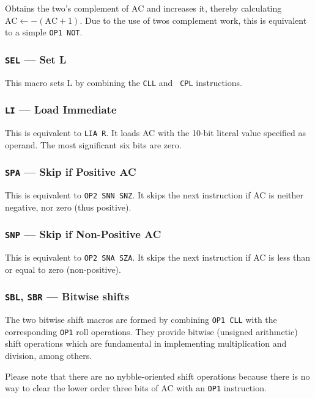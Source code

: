 \documentclass[11pt,a4paper,twocolumns]{article}
\newcommand\register[1]{\textsf{#1}}
\newcommand\A{\register{AC}}
\newcommand\Lreg{\register{L}}
\begin{document}
Obtains the two's complement of \A{} and increases it, thereby
calculating $\mbox{AC} \leftarrow -(\mbox{AC} + 1)$. Due to the use of
twos complement work, this is equivalent to a simple {\tt OP1 NOT}.

\subsubsection{{\tt SEL} — Set L}

This macro sets \Lreg{} by combining the {\tt CLL} and {\tt
  CPL} instructions.

\subsubsection{{\tt LI} — Load Immediate}

This is equivalent to {\tt LIA R}. It loads \A{} with the 10-bit literal
value specified as operand. The most significant six bits are zero.

\subsubsection{{\tt SPA} — Skip if Positive \A}

This is equivalent to {\tt OP2 SNN SNZ}. It skips the next instruction
if \A{} is neither negative, nor zero (thus positive).

\subsubsection{{\tt SNP} — Skip if Non-Positive \A}

This is equivalent to {\tt OP2 SNA SZA}. It skips the next instruction
if \A{} is less than or equal to zero (non-positive).

\subsubsection{{\tt SBL}, {\tt SBR} — Bitwise shifts}

The two bitwise shift macros are formed by combining {\tt OP1 CLL} with
the corresponding {\tt OP1} roll operations. They provide bitwise
(unsigned arithmetic) shift operations which are fundamental in
implementing multiplication and division, among others.

Please note that there are no nybble-oriented shift operations because
there is no way to clear the lower order three bits of \A{} with an
{\tt OP1} instruction.
\end{document}
